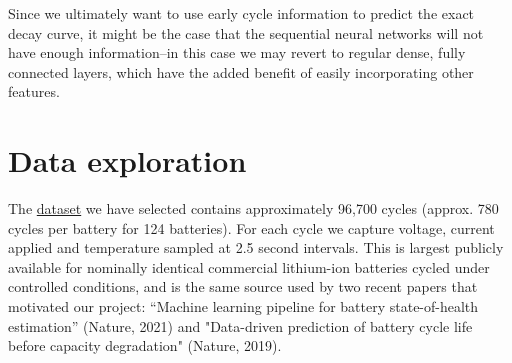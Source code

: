 Since we ultimately want to use early cycle information to predict the exact decay curve, it might be the case that the sequential neural networks will not have enough information--in this case we may revert to regular dense, fully connected layers, which have the added benefit of easily incorporating other features.  


\section{Data exploration}
The \href{https://data.matr.io/1/projects/5c48dd2bc625d700019f3204}{dataset} we have selected contains approximately 96,700 cycles (approx. 780 cycles per battery for 124 batteries). For each cycle we capture voltage, current applied and temperature sampled at 2.5 second intervals. This is largest publicly available for nominally identical commercial lithium-ion batteries cycled under controlled conditions, and is the same source used by two recent papers that motivated our project: “Machine learning pipeline for battery state-of-health estimation” (Nature, 2021)\cite{roman2021machine} and "Data-driven prediction of battery cycle life before capacity degradation" (Nature, 2019)\cite{severson2019data}.

